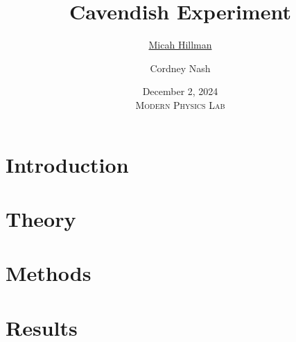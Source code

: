 \documentclass[12pt]{report}
\title{\textbf{Cavendish Experiment} \\\vspace{-0.6cm}}
\date{
    December 2, 2024 \\\vspace{0.5cm}
    \large{\textsc{Modern Physics Lab}}
}
\author{
    \ul{Micah Hillman} \and Cordney Nash
}
\begin{document}
\maketitle

\section*{Introduction}
{

}

\section*{Theory}
{

}

\section*{Methods}
{

}

\section*{Results}
{
    
}
\end{document}
